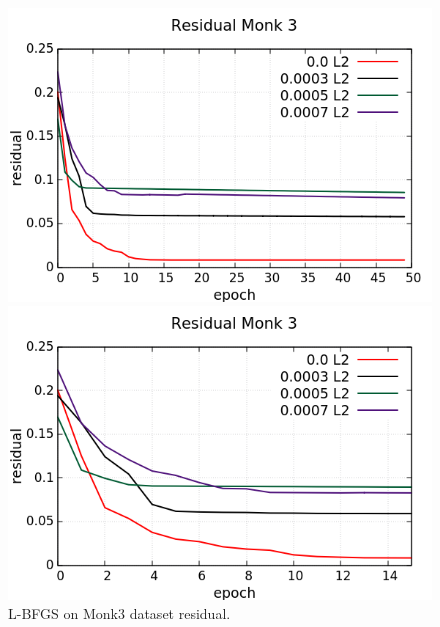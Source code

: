 \begin{figure}[H]
	\centering
	\begin{minipage}[t]{0.5\linewidth}
		\includegraphics[width=\linewidth]{data/LBFGS/Monk3/Monk3_LBFGS_Residual_standard.png}
	\end{minipage}%
	\begin{minipage}[t]{0.5\linewidth}
		\includegraphics[width=\linewidth]{data/LBFGS/Monk3/Monk3_LBFGS_Residual_zoom.png}
	\end{minipage}
	\caption{L-BFGS on Monk3 dataset residual.}
\end{figure}
